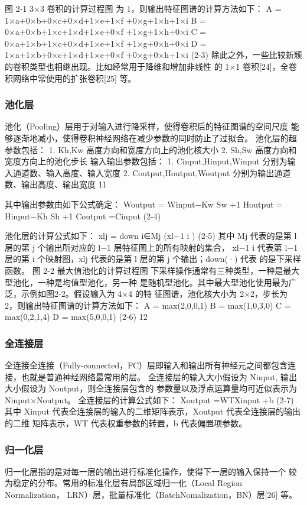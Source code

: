 图 2-1 3×3 卷积的计算过程图 为 1，则输出特征图谱的计算方法如下： A = 1×a+0×b+0×c+0×d+1×e+1×f +0×g+1×h+1×i B = 0×a+0×b+1×c+1×d+1×e+0×f +1×g+1×h+0×i C = 0×a+1×b+1×c+0×d+1×e+1×f +1×g+0×h+0×i D = 1×a+1×b+0×c+1×d+1×e+0×f +0×g+0×h+1×i
(2-3)
除此之外，一些比较新颖的卷积类型也相继出现。比如经常用于降维和增加非线性 的 1×1 卷积[24]，全卷积网络中常使用的扩张卷积[25] 等。

\subsubsection{池化层}
池化（Pooling）层用于对输入进行降采样，使得卷积后的特征图谱的空间尺度 能够逐渐地减小，使得卷积神经网络在减少参数的同时防止了过拟合。 池化层的超参数包括：
1. Kh,Kw 高度方向和宽度方向上的池化核大小 2. Sh,Sw 高度方向和宽度方向上的池化步长
输入输出参数包括：
1. Cinput,Hinput,Winput 分别为输入通道数、输入高度、输入宽度 2. Coutput,Houtput,Woutput 分别为输出通道数、输出高度、输出宽度
11

其中输出参数由如下公式确定：
Woutput =
Winput−Kw Sw
+1
Houtput =
Hinput−Kh Sh
+1
Coutput =Cinput
(2-4)


池化层的计算公式如下：
xlj = down i∈Mj (xl−1 i ) (2-5) 其中 Mj 代表的是第 l 层的第 j 个输出所对应的 l−1 层特征图上的所有映射的集合， xl−1 i 代表第 l−1 层的第 i 个映射图，xlj 代表的是第 l 层的第 j 个输出；down(·) 代表 的是下采样函数。
图 2-2 最大值池化的计算过程图
下采样操作通常有三种类型，一种是最大型池化，一种是均值型池化，另一种 是随机型池化。其中最大型池化使用最为广泛，示例如图2-2。假设输入为 4×4 的特 征图谱，池化核大小为 2×2，步长为 2，则输出特征图谱的计算方法如下： A = max(2,0,0,1) B = max(1,0,3,0) C = max(0,2,1,4) D = max(5,0,0,1) (2-6)
12

\subsubsection{全连接层}
全连接全连接（Fully-connected，FC）层即输入和输出所有神经元之间都包含连 接，也就是普通神经网络最常用的层。 全连接层的输入大小假设为 Ninput, 输出大小假设为 Noutput，则全连接层包含的 参数量以及浮点运算量均可近似表示为 Ninput×Noutput。 全连接层的计算公式如下：
Xoutput =WTXinput +b (2-7)
其中 Xinput 代表全连接层的输入的二维矩阵表示，Xoutput 代表全连接层的输出的二维 矩阵表示，WT 代表权重参数的转置，b 代表偏置项参数。

\subsubsection{归一化层}
归一化层指的是对每一层的输出进行标准化操作，使得下一层的输入保持一个 较为稳定的分布。常用的标准化层有局部区域归一化（Local Region Normalization， LRN）层，批量标准化（BatchNomalization，BN）层[26] 等。

